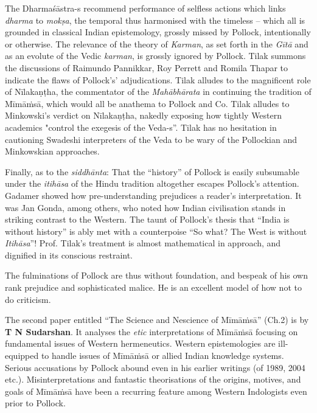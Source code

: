 The Dharmaśāstra-s recommend performance of selfless actions which links \textit{dharma} to \textit{mokṣa}, the temporal thus harmonised with the timeless – which all is grounded in classical Indian epistemology, grossly missed by Pollock, intentionally or otherwise. The relevance of the theory of \textit{Karman}, as set forth in the \textit{Gītā} and as an evolute of the Vedic \textit{karman}, is grossly ignored by Pollock. Tilak summons the discussions of Raimundo Pannikkar, Roy Perrett and Romila Thapar to indicate the flaws of Pollock’s’ adjudications. Tilak alludes to the magnificent role of Nīlakaṇṭha, the commentator of the \textit{Mahābhārata} in continuing the tradition of Mīmāṁsā, which would all be anathema to Pollock and Co. Tilak alludes to Minkowski’s verdict on Nīlakaṇṭha, nakedly exposing how tightly Western academics "control the exegesis of the Veda-s”. Tilak has no hesitation in cautioning Swadeshi interpreters of the Veda to be wary of the Pollockian and Minkowskian approaches.

Finally, as to the \textit{siddhānta}: That the “history” of Pollock is easily subsumable under the \textit{itihāsa} of the Hindu tradition altogether escapes Pollock's attention. Gadamer showed how pre-understanding prejudices a reader’s interpretation. It was Jan Gonda, among others, who noted how Indian civilisation stands in striking contrast to the Western. The taunt of Pollock’s thesis that “India is without history” is ably met with a counterpoise “So what? The West is without \textit{Itihāsa}”! Prof. Tilak’s treatment is almost mathematical in approach, and dignified in its conscious restraint. 

The fulminations of Pollock are thus without foundation, and bespeak of his own rank prejudice and sophisticated malice. He is an excellent model of how not to do criticism.

The second paper entitled “The Science and Nescience of Mīmāṁsā” (Ch.2) is by \textbf{T N Sudarshan}. It analyses the \textit{etic} interpretations of Mīmāṁsā focusing on fundamental issues of Western hermeneutics. Western epistemologies are ill-equipped to handle issues of Mīmāṁsā or allied Indian knowledge systems. Serious accusations by Pollock abound even in his earlier writings (of 1989, 2004 etc.). Misinterpretations and fantastic theorisations of the origins, motives, and goals of Mīmāṁsā have been a recurring feature among Western Indologists even prior to Pollock. 

